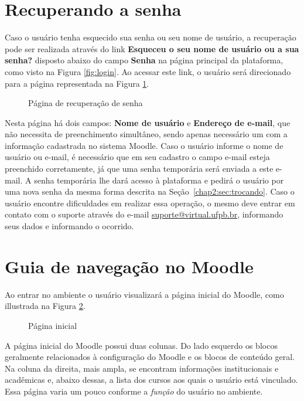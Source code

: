 \section{Recuperando a senha}
Caso o usuário tenha esquecido sua senha ou seu nome de usuário, a recuperação pode ser realizada através do link \textbf{Esqueceu o seu nome de usuário ou a sua senha? }disposto abaixo do campo \textbf{Senha} na página principal da plataforma, como visto na Figura \ref{fig:login}. Ao acessar este link, o usuário será direcionado para a página representada na Figura \ref{fig:recupera senha}.

\begin{figure}[htbp]
 \begin{center}
  \caption{Página de recuperação de senha}
  \label{fig:recupera senha}
 \end{center}
\end{figure}
Nesta página há dois campos: \textbf{Nome de usuário} e \textbf{Endereço de e-mail}, que não necessita de preenchimento simultâneo, sendo apenas necessário um com a informação cadastrada no sistema Moodle. Caso o usuário informe o nome de usuário ou e-mail, é necessário que em seu cadastro o campo e-mail esteja preenchido corretamente, já que uma senha temporária será enviada a este e-mail. A senha temporária lhe dará acesso à plataforma e pedirá o usuário por uma nova senha da mesma forma descrita na Seção~\ref{chap2:sec:trocando}. 
Caso o usuário encontre dificuldades em realizar essa operação, o mesmo deve entrar em contato com o suporte através do e-mail \url{suporte@virtual.ufpb.br}, informando seus dados e informando o ocorrido.

\section{Guia de navegação no Moodle}
Ao entrar no ambiente o usuário visualizará a página inicial do Moodle, como illustrada na Figura \ref{fig:inicio}.

\begin{figure}[htbp]
 \begin{center}
  \caption{Página inicial}
  \label{fig:inicio}
 \end{center}
\end{figure}
A página inicial do Moodle possui duas colunas. Do lado esquerdo os blocos geralmente relacionados à configuração do Moodle e os blocos de conteúdo geral. Na coluna da direita, mais ampla, se encontram informações institucionais e acadêmicas e, abaixo dessas, a lista dos cursos aos quais o usuário está vinculado. Essa página varia um pouco conforme a \emph{função} do usuário no ambiente.

